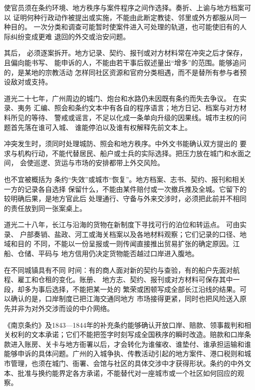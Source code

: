 使官员须在条约环境、地方秩序与案件程序之间作选择。奏折、上谕与地方档案可以
证明何种行政动作被提出或实施，不能由此断定教徒、邻里或外方都服从同一种目的。
一次分类和调查可能暂时使案件进入可处理的轨道，也可能使旧有的人际纠纷变成更难
退回的外交或治安问题。

其后，
必须逐案拆开。地方记录、契约、报刊或对方材料常在冲突之后才保存，且偏向能书写、
能申诉的人，不能由若干事后叙述量出“增多”的范围。能够追问的，是某地的宗教活动
怎样同社区资源和官府分类相遇，而不是替所有参与者预设敌对或支持。

道光二十七年，广州周边的城门、炮台和水路仍未因既有条约而失去争议。
在实录、夷务
汇编、照会和条约文本中有各自的程序语言；地方日记、档案与对方材料所见的等待、
警戒或谣言，不足以化成一条单向升级的因果线。城市主权的问题首先落在谁可入城、
谁能停泊以及谁有权解释先前文本上。

冲突发生时，须同时处理城防、照会和地方秩序。中外文书能确认双方提出的
要求与机构行动，不能代替居民、船户或士兵的实际选择。把压力放在城门和水面之间，
会使巡逻、货运与市场的安排都带上外交风险。

也不宜被概括为
条约“失效”或城市“恢复”。地方档案、志书、契约、报刊和相关一方的记录各自选择
保留什么，不能由某件赔付或一次撤兵推及全城。它留下的较明确后果，是地方官此后
处理通行、守备与外来交涉时，必须把此前并不相同的责任放到同一张案桌上。

道光二十八年，长江与沿海的货物在新制度下寻找可行的泊位和转运点。
可由实录、
户部奏销、盐政、河工或海关档案以及各地材料观察；它们记录的口径、地域和目的
不同，不能以一份呈报或一则传闻直接推出贸易扩张的确定原因。江船、仓储、平码与
地方信用仍决定货物能否越过口岸进入腹地。

在不同城镇具有不同
时间：有的商人面对新的契约与查验，有的船户先面对航程、雇工和仓租的变化。账册、
地方志、契约、报刊或对方材料可保存其中一段，却多为事后选择，不能把某一处的
繁荣或困顿写成全部长江沿线的结果。可以确认的是，口岸制度已把江海交通同地方
市场接得更紧，同时也把风险送入原先并非为对外交涉而设的中介网络。

《南京条约》及1843—1844年的补充条约能够确认开放口岸、赔款、领事裁判和相关权利的文本承诺；它们不能把签字时刻写成全国秩序的瞬时改造。赔款和口岸条款进入账房、关卡与地方衙署以后，才会转化为谁催收、谁垫付、谁承担运输和谁能够申诉的具体问题。广州的入城争执、传教活动引起的地方案件、港口税则和城市管理，也须在城门、衙署、会馆与社区的具体交涉中才获得形状。条约的中外文本、批准与换约能界定各方承诺，不能替代对一座城市或一个社区如何回应的观察。

